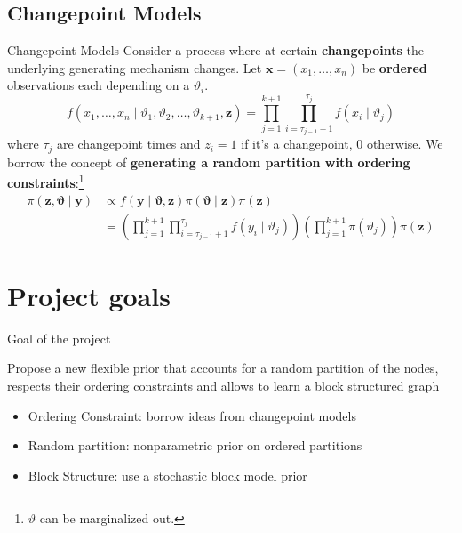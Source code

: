 \subsection{Changepoint Models}
\begin{frame}{Changepoint Models}
    Consider a process where at certain \textbf{changepoints} the underlying generating mechanism changes. Let $\mathbf{x}=(x_{1},\ldots,x_{n})$ be \textbf{ordered} observations each depending on a $\vartheta_{i}.$\\
    \[
        f(x_{1},\ldots,x_{n} \mid \vartheta_1, \vartheta_2, \ldots, \vartheta_{k+1}, \boldsymbol{z})=\prod_{j=1}^{k+1} \prod_{i=\tau_{j-1}+1}^{\tau_j} f(x_i \mid \vartheta_j)
    \]
    where $\tau_j$ are changepoint times and $z_{i} = 1$ if it's a changepoint, $0$ otherwise.
    We borrow the concept of \textbf{generating a random partition with ordering constraints}:\footnote{$\vartheta$ can be marginalized out.}
    \begin{align*}
        \pi(\mathbf{z}, \mathbf{\vartheta} \mid \mathbf{y}) & \propto f(\mathbf{y} \mid \mathbf{\vartheta}, \mathbf{z}) \pi(\mathbf{\vartheta} \mid \mathbf{z}) \pi(\mathbf{z}) \\
        &=\left(\prod_{j=1}^{k+1} \prod_{i=\tau_{j-1}+1}^{\tau_j} f(y_i \mid \vartheta_j)\right)\left(\prod_{j=1}^{k+1} \pi(\vartheta_j)\right) \pi(\mathbf{z})
    \end{align*}
\end{frame}








\section{Project goals}


\begin{frame}[containsverbatim]{Goal of the project}

Propose a \alert {new flexible prior that accounts for a random partition of the nodes}, respects their ordering constraints and allows to learn a block structured graph

 \begin{itemize}
     \item Ordering Constraint: borrow ideas from changepoint models
     \item Random partition: nonparametric prior on ordered partitions
     \item Block Structure: use a stochastic block model prior
 \end{itemize}



\end{frame}

